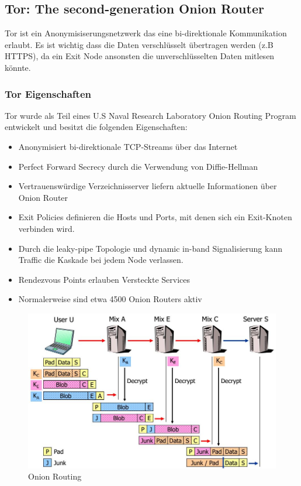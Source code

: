 \subsection{Tor: The second-generation Onion Router}
\label{sec:tor}
Tor ist ein Anonymisiserungsnetzwerk das eine bi-direktionale Kommunikation erlaubt. Es ist wichtig dass die Daten verschlüsselt übertragen werden (z.B HTTPS), da ein Exit Node ansonsten die unverschlüsselten Daten mitlesen könnte.

\subsubsection{Tor Eigenschaften}
Tor wurde als Teil eines U.S Naval Research Laboratory Onion Routing Program entwickelt und besitzt die folgenden Eigenschaften:
\begin{itemize}
    \item Anonymisiert bi-direktionale  TCP-Streams über das Internet
    \item Perfect Forward Secrecy durch die Verwendung von Diffie-Hellman
    \item Vertrauenswürdige Verzeichnisserver liefern aktuelle Informationen über Onion Router
    \item Exit Policies definieren die Hosts und Ports, mit denen sich ein Exit-Knoten verbinden wird.
    \item Durch die leaky-pipe Topologie und dynamic in-band Signalisierung kann Traffic die Kaskade bei jedem Node verlassen.
    \item Rendezvous Points erlauben Versteckte Services
    \item Normalerweise sind etwa 4500 Onion Routers aktiv
\end{itemize}

\begin{figure}[h]
	\centering
	\includegraphics[width=0.7\linewidth]{images/onion_routing}
	\caption{Onion Routing}
	\label{fig:onionrouting}
\end{figure}
\newpage
